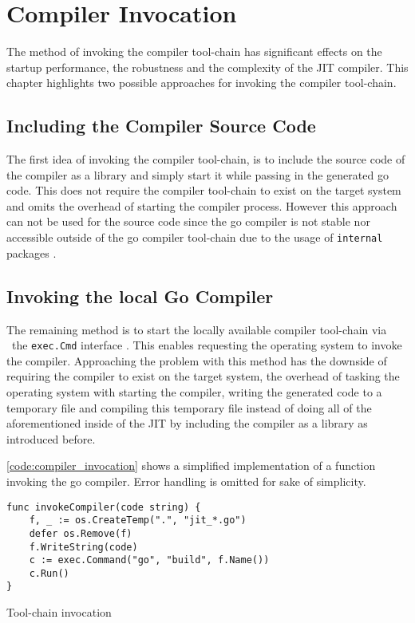 \chapter{Compiler Invocation}

The method of invoking the compiler tool-chain has significant effects on the
startup performance, the robustness and the complexity of the JIT compiler.
This chapter highlights two possible approaches for invoking the compiler
tool-chain. 

\section{Including the Compiler Source Code}

The first idea of invoking the compiler tool-chain, is to include the source
code of the compiler as a library and simply start it while passing in the
generated go code. This does not require the compiler tool-chain to exist on
the target system and omits the overhead of starting the compiler process.
However this approach can not be used for the source code since the go compiler
is not stable nor accessible outside of the go compiler tool-chain
\cite[\textit{(gcToolchain).gc}]{gc_source} due to the usage of
\texttt{internal} packages \cite{go_internal_dir}.

\section{Invoking the local Go Compiler}

The remaining method is to start the locally available compiler tool-chain via
\ the \texttt{exec.Cmd} interface \cite[Overview]{go_os_exec}. This enables
requesting the operating system to invoke the compiler. Approaching the problem
with this method has the downside of requiring the compiler to exist on the
target system, the overhead of tasking the operating system with starting the
compiler, writing the generated code to a temporary file and compiling this
temporary file instead of doing all of the aforementioned inside of the JIT by
including the compiler as a library as introduced before.

\autoref{code:compiler_invocation} shows a simplified implementation of a
function invoking the go compiler. Error handling is omitted for sake of
simplicity.

\begin{listing}[H]
    \begin{verbatim}
func invokeCompiler(code string) {
    f, _ := os.CreateTemp(".", "jit_*.go")
    defer os.Remove(f)
    f.WriteString(code)
    c := exec.Command("go", "build", f.Name())
    c.Run()
}
    \end{verbatim}
    \caption{Tool-chain invocation}
    \label{code:compiler_invocation}
\end{listing}

